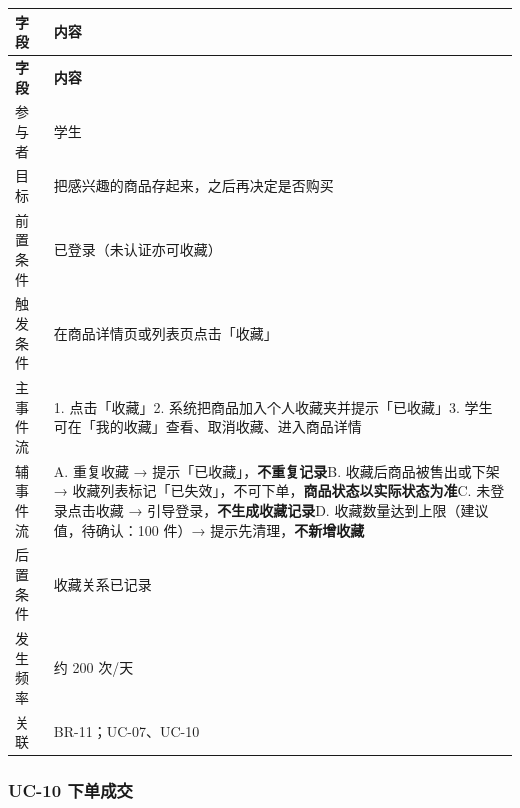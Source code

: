\documentclass[12pt,a4paper]{ctexart}
\begin{document}
{\footnotesize
\begin{longtable}{|p{2.75cm}|p{13.25cm}|}
\hline
\textbf{字段} & \textbf{内容} \\
\hline
\endfirsthead
\hline
\textbf{字段} & \textbf{内容} \\
\hline
\endhead
\hline
\endfoot
参与者 & 学生 \\
\hline
目标 & 把感兴趣的商品存起来，之后再决定是否购买 \\
\hline
前置条件 & 已登录（未认证亦可收藏） \\
\hline
触发条件 & 在商品详情页或列表页点击「收藏」 \\
\hline
主事件流 & 1. 点击「收藏」\newline{}2. 系统把商品加入个人收藏夹并提示「已收藏」\newline{}3. 学生可在「我的收藏」查看、取消收藏、进入商品详情 \\
\hline
辅事件流 & A. 重复收藏 → 提示「已收藏」，\textbf{不重复记录}\newline{}B. 收藏后商品被售出或下架 → 收藏列表标记「已失效」，不可下单，\textbf{商品状态以实际状态为准}\newline{}C. 未登录点击收藏 → 引导登录，\textbf{不生成收藏记录}\newline{}D. 收藏数量达到上限（建议值，待确认：100 件）→ 提示先清理，\textbf{不新增收藏} \\
\hline
后置条件 & 收藏关系已记录 \\
\hline
发生频率 & 约 200 次/天 \\
\hline
关联 & BR-11；UC-07、UC-10 \\
\hline
\end{longtable}
}


\subsubsection*{UC-10 下单成交}
\end{document}

